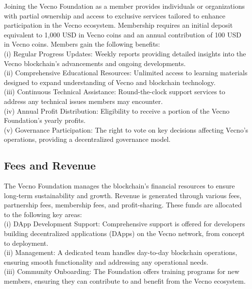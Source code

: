 \documentclass[a4paper,onecolumn,superscriptaddress,10pt]{compositionalityarticle}
\begin{document}
Joining the Vecno Foundation as a member provides individuals or organizations with partial ownership and access to exclusive services tailored to enhance participation in the Vecno ecosystem. Membership requires an initial deposit equivalent to 1,000 USD in Vecno coins and an annual contribution of 100 USD in Vecno coins. Members gain the following benefits:\\ (i) Regular Progress Updates: Weekly reports providing detailed insights into the Vecno blockchain’s advancements and ongoing developments.\\ (ii) Comprehensive Educational Resources: Unlimited access to learning materials designed to expand understanding of Vecno and blockchain technology.\\ (iii) Continuous Technical Assistance: Round-the-clock support services to address any technical issues members may encounter.\\ (iv) Annual Profit Distribution: Eligibility to receive a portion of the Vecno Foundation’s yearly profits.\\ (v) Governance Participation: The right to vote on key decisions affecting Vecno’s operations, providing a decentralized governance model.

\vspace{0.3cm}

\subsection{Fees and Revenue}\label{sec2.2}

The Vecno Foundation manages the blockchain’s financial resources to ensure long-term sustainability and growth. Revenue is generated through various fees, partnership fees, membership fees, and profit-sharing. These funds are allocated to the following key areas:\\ (i) DApp Development Support: Comprehensive support is offered for developers building decentralized applications (DApps) on the Vecno network, from concept to deployment.\\ (ii) Management: A dedicated team handles day-to-day blockchain operations, ensuring smooth functionality and addressing any operational needs.\\ (iii) Community Onboarding: The Foundation offers training programs for new members, ensuring they can contribute to and benefit from the Vecno ecosystem.

\vspace{0.3cm}
\end{document}

